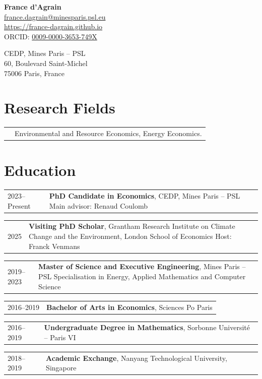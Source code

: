 \documentclass[11pt]{article}
\makeatletter
\newcommand{\cvrow}[2]{%
  \begin{tabularx}{\textwidth}{@{}p{2.3cm}@{\hspace{0.35cm}}X@{}}
    #1 & #2
  \end{tabularx}\par\vspace{5pt}%
}
\makeatother
\begin{document}
\begin{minipage}[t]{0.60\textwidth}
  {\LARGE\bfseries France d'Agrain}\\[8pt]
  \href{mailto:france.dagrain@minesparis.psl.eu}{france.dagrain@minesparis.psl.eu}\\
  \href{https://france-dagrain.github.io}{https://france-dagrain.github.io}\\
  ORCID: \href{https://orcid.org/0009-0000-3653-749X}{0009-0000-3653-749X}
\end{minipage}%
\begin{minipage}[t]{0.40\textwidth}
  \raggedleft
  \vspace{4pt}
  CEDP, Mines Paris -- PSL\\
  60, Boulevard Saint-Michel\\
  75006 Paris, France
\end{minipage}

\vspace{6pt}

\section{Research Fields}
\cvrow{}{Environmental and Resource Economics, Energy Economics.}

\section{Education}
\cvrow{2023--Present}{\textbf{PhD Candidate in Economics}, CEDP, Mines Paris -- PSL\newline
  Main advisor: Renaud Coulomb}
\cvrow{2025}{\textbf{Visiting PhD Scholar}, Grantham Research Institute on Climate Change
  and the Environment, London School of Economics\newline
  Host: Franck Venmans}
\cvrow{2019--2023}{\textbf{Master of Science and Executive Engineering}, Mines Paris -- PSL\newline
  Specialisation in Energy, Applied Mathematics and Computer Science}
\cvrow{2016--2019}{\textbf{Bachelor of Arts in Economics}, Sciences Po Paris}
\cvrow{2016--2019}{\textbf{Undergraduate Degree in Mathematics}, Sorbonne Universit\'e -- Paris VI}
\cvrow{2018--2019}{\textbf{Academic Exchange}, Nanyang Technological University, Singapore}

\end{document}
